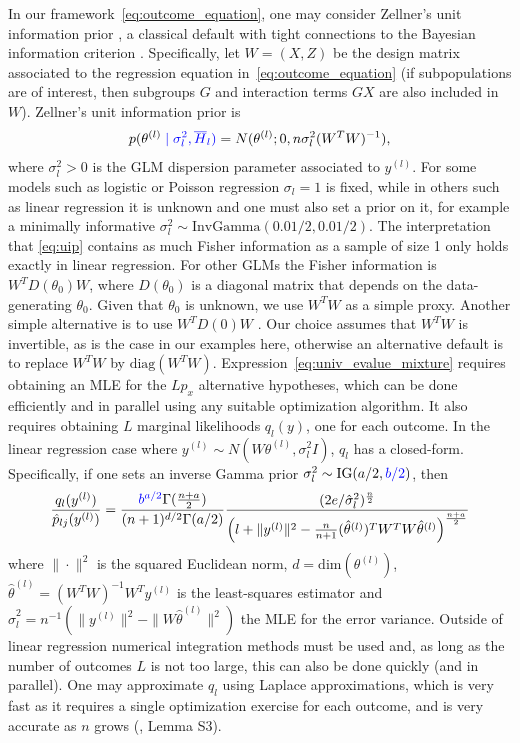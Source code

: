 \documentclass[pdflatex,sn-mathphys-num]{sn-jnl}%
\theoremstyle{thmstyleone}%
\theoremstyle{thmstyletwo}%
\theoremstyle{thmstylethree}%
\begin{document}
In our framework~\eqref{eq:outcome_equation}, one may consider Zellner's unit information prior \citep{zellner:1986}, a classical default with tight connections to the Bayesian information criterion \citep{schwarz:1978}.
Specifically, let $W=(X, Z)$ be the design matrix associated to the regression equation in~\eqref{eq:outcome_equation} (if subpopulations are of interest, then subgroups $G$ and interaction terms $GX$ are also included in $W$).
Zellner's unit information prior is
\begin{align}
p(\theta^{(l)} \color{blue} \mid \sigma_l^2, \overline{H}_l) \color{black} = N(\theta^{(l)}; 0, n \sigma_l^2 (W^T W)^{-1}),
\label{eq:uip}
\end{align}
where $\sigma_l^2 > 0$ is the GLM dispersion parameter associated to $y^{(l)}$.
\color{blue} For some models such as logistic or Poisson regression $\sigma_l=1$ is fixed, while in others such as linear regression it is unknown and one must also set a prior on it, for example a minimally informative $\sigma_l^2 \sim \mbox{InvGamma}(0.01/2, 0.01/2)$. The interpretation that \eqref{eq:uip} contains as much Fisher information as a sample of size 1 only holds exactly in linear regression. For other GLMs the Fisher information is $W^T D(\theta_0) W$, where $D(\theta_0)$ is a diagonal matrix that depends on the data-generating $\theta_0$. Given that $\theta_0$ is unknown, we use $W^T W$ as a simple proxy. Another simple alternative is to use $W^T D(0) W$ \citep{sabanes:2011}. \color{black}
Our choice assumes that $W^T W$ is invertible, as is the case in our examples here, otherwise an alternative default is to replace $W^TW$ by $\mbox{diag}(W^T W)$. Expression~\eqref{eq:univ_evalue_mixture} requires obtaining an MLE for the $L p_x$ alternative hypotheses, which can be done efficiently and in parallel using any suitable optimization algorithm.
It also requires obtaining $L$ marginal likelihoods $q_l(y)$, one for each outcome.
In the linear regression case where $y^{(l)} \sim N(W \theta^{(l)}, \sigma_l^2 I)$, $q_l$ has a closed-form.
Specifically, if one sets an inverse Gamma prior $\sigma_l^2 \sim \mbox{IG}(a/2,\color{blue} b/2 \color{black})$, then
\begin{align}
 \frac{q_l(y^{(l)})}{\hat{p}_{lj}(y^{(l)})}= 
\frac{\color{blue} b^{a/2} \color{black} \Gamma(\frac{n+a}{2})}{(n + 1)^{d/2} \Gamma(a/2)}
\frac{(2 e/\hat{\sigma}_l^2)^{\frac{n}{2}}}{\left( l+ \| y^{(l)} \|^2 - \frac{n}{n+1} (\hat{\theta}^{(l)})^T W^T W \hat{\theta}^{(l)} \right)^{\frac{n + a}{2}}}
\nonumber
\end{align}
where $\| \cdot \|^2$ is the squared Euclidean norm, $d=\mbox{dim}(\theta^{(l)})$, $\hat{\theta}^{(l)}= (W^T W)^{-1} W^T y^{(l)}$ is the least-squares estimator and $\hat{\sigma}_l^2= n^{-1}(\| y^{(l)} \|^2 - \| W \hat{\theta}^{(l)} \|^2)$ the MLE for the error variance.
Outside of linear regression numerical integration methods must be used and, as long as the number of outcomes $L$ is not too large, this can also be done quickly (and in parallel).
One may approximate $q_l$ using Laplace approximations, which is very fast as it requires a single optimization exercise for each outcome, and is very accurate as $n$ grows (\cite{kass:1990}, \cite{rossell:2021b} Lemma S3).
\end{document}
